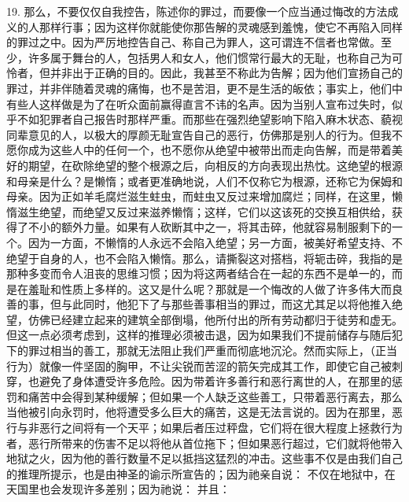 19. 那么，不要仅仅自我控告，陈述你的罪过，而要像一个应当通过悔改的方法成义的人那样行事；因为这样你就能使你那告解的灵魂感到羞愧，使它不再陷入同样的罪过之中。因为严厉地控告自己、称自己为罪人，这可谓连不信者也常做。至少，许多属于舞台的人，包括男人和女人，他们惯常行最大的无耻，也称自己为可怜者，但并非出于正确的目的。因此，我甚至不称此为告解；因为他们宣扬自己的罪过，并非伴随着灵魂的痛悔，也不是苦泪，更不是生活的皈依；事实上，他们中有些人这样做是为了在听众面前赢得直言不讳的名声。因为当别人宣布过失时，似乎不如犯罪者自己报告时那样严重。而那些在强烈绝望影响下陷入麻木状态、藐视同辈意见的人，以极大的厚颜无耻宣告自己的恶行，仿佛那是别人的行为。但我不愿你成为这些人中的任何一个，也不愿你从绝望中被带出而走向告解，而是带着美好的期望，在砍除绝望的整个根源之后，向相反的方向表现出热忱。这绝望的根源和母亲是什么？是懒惰；或者更准确地说，人们不仅称它为根源，还称它为保姆和母亲。因为正如羊毛腐烂滋生蛀虫，而蛀虫又反过来增加腐烂；同样，在这里，懒惰滋生绝望，而绝望又反过来滋养懒惰；这样，它们以这该死的交换互相供给，获得了不小的额外力量。如果有人砍断其中之一，将其击碎，他就容易制服剩下的一个。因为一方面，不懒惰的人永远不会陷入绝望；另一方面，被美好希望支持、不绝望于自身的人，也不会陷入懒惰。那么，请撕裂这对搭档，将轭击碎，我指的是那种多变而令人沮丧的思维习惯；因为将这两者结合在一起的东西不是单一的，而是在羞耻和性质上多样的。这又是什么呢？那就是一个悔改的人做了许多伟大而良善的事，但与此同时，他犯下了与那些善事相当的罪过，而这尤其足以将他推入绝望，仿佛已经建立起来的建筑全部倒塌，他所付出的所有劳动都归于徒劳和虚无。但这一点必须考虑到，这样的推理必须被击退，因为如果我们不提前储存与随后犯下的罪过相当的善工，那就无法阻止我们严重而彻底地沉沦。然而实际上，（正当行为）就像一件坚固的胸甲，不让尖锐而苦涩的箭矢完成其工作，即使它自己被刺穿，也避免了身体遭受许多危险。因为带着许多善行和恶行离世的人，在那里的惩罚和痛苦中会得到某种缓解；但如果一个人缺乏这些善工，只带着恶行离去，那么当他被引向永罚时，他将遭受多么巨大的痛苦，这是无法言说的。因为在那里，恶行与非恶行之间将有一个天平；如果后者压过秤盘，它们将在很大程度上拯救行为者，恶行所带来的伤害不足以将他从首位拖下；但如果恶行超过，它们就将他带入地狱之火，因为他的善行数量不足以抵挡这猛烈的冲击。这些事不仅是由我们自己的推理所提示，也是由神圣的谕示所宣告的；因为祂亲自说： 不仅在地狱中，在天国里也会发现许多差别；因为祂说： 并且： 